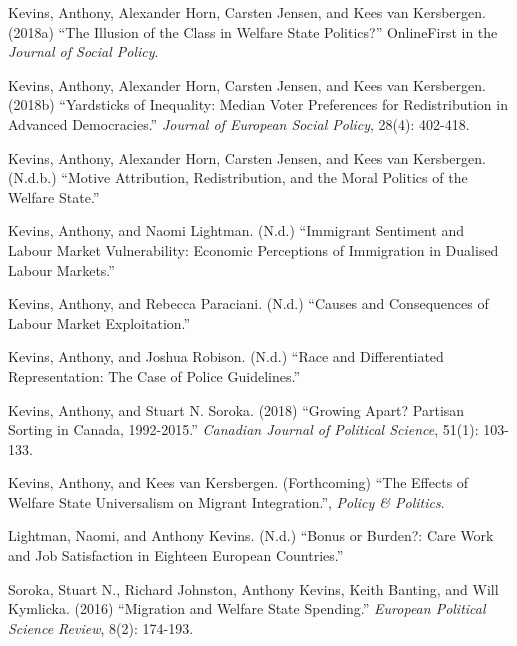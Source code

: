 \documentclass[letterpaper]{scrartcl}
\begin{document}
\begin{hangparas}{.25in}{1}
    Kevins, Anthony, Alexander Horn, Carsten Jensen, and Kees van Kersbergen. (2018a) ``The Illusion of the Class in Welfare State Politics?'' OnlineFirst in the \textit{Journal of Social Policy}.
    \vspace{-.5em}

    Kevins, Anthony, Alexander Horn, Carsten Jensen, and Kees van Kersbergen. (2018b) ``Yardsticks of Inequality: Median Voter Preferences for Redistribution in Advanced Democracies.'' \textit{Journal of European Social Policy}, 28(4): 402-418.
    \vspace{-.5em}

    Kevins, Anthony, Alexander Horn, Carsten Jensen, and Kees van Kersbergen. (N.d.b.) ``Motive Attribution, Redistribution, and the Moral Politics of the Welfare State.''
    \vspace{-.5em}

    Kevins, Anthony, and Naomi Lightman. (N.d.) ``Immigrant Sentiment and Labour Market Vulnerability: Economic Perceptions of Immigration in Dualised Labour Markets.''
    \vspace{-.5em}

    Kevins, Anthony, and Rebecca Paraciani. (N.d.) ``Causes and Consequences of Labour Market Exploitation.''
    \vspace{-.5em}

    Kevins, Anthony, and Joshua Robison. (N.d.) ``Race and Differentiated Representation: The Case of Police Guidelines.'' \vspace{-.5em}

    Kevins, Anthony, and Stuart N. Soroka. (2018) ``Growing Apart? Partisan Sorting in Canada, 1992-2015.'' \textit{Canadian Journal of Political Science}, 51(1): 103-133.
    \vspace{-.5em}

    Kevins, Anthony, and Kees van Kersbergen. (Forthcoming) ``The Effects of Welfare State Universalism on Migrant Integration.'', \textit{Policy \& Politics}. \vspace{-.5em}

    Lightman, Naomi, and Anthony Kevins. (N.d.) ``Bonus or Burden?: Care Work and Job Satisfaction in Eighteen European Countries.''
    \vspace{-.5em}

    Soroka, Stuart N., Richard Johnston, Anthony Kevins, Keith Banting, and Will Kymlicka. (2016) ``Migration and Welfare State Spending.'' \textit{European Political Science Review}, 8(2): 174-193.

  \end{hangparas}
\end{document}
